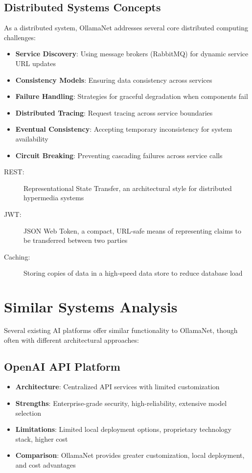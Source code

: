 \subsection{Distributed Systems Concepts}

As a distributed system, OllamaNet addresses several core distributed computing challenges:

\begin{itemize}
    \item \textbf{Service Discovery}: Using message brokers (RabbitMQ) for dynamic service URL updates
    \item \textbf{Consistency Models}: Ensuring data consistency across services
    \item \textbf{Failure Handling}: Strategies for graceful degradation when components fail
    \item \textbf{Distributed Tracing}: Request tracing across service boundaries
    \item \textbf{Eventual Consistency}: Accepting temporary inconsistency for system availability
    \item \textbf{Circuit Breaking}: Preventing cascading failures across service calls
\end{itemize}

\begin{terminology}
\begin{description}
    \item[REST:] Representational State Transfer, an architectural style for distributed hypermedia systems
    \item[JWT:] JSON Web Token, a compact, URL-safe means of representing claims to be transferred between two parties
    \item[Caching:] Storing copies of data in a high-speed data store to reduce database load
\end{description}
\end{terminology}

\section{Similar Systems Analysis}

Several existing AI platforms offer similar functionality to OllamaNet, though often with different architectural approaches:

\subsection*{OpenAI API Platform}
\begin{itemize}
    \item \textbf{Architecture}: Centralized API services with limited customization
    \item \textbf{Strengths}: Enterprise-grade security, high-reliability, extensive model selection
    \item \textbf{Limitations}: Limited local deployment options, proprietary technology stack, higher cost
    \item \textbf{Comparison}: OllamaNet provides greater customization, local deployment, and cost advantages
\end{itemize}

